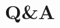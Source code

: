 \documentclass{beamer}
\begin{document}
\section{Q\&A}
\begin{frame}
\end{frame}


%
\end{document}
